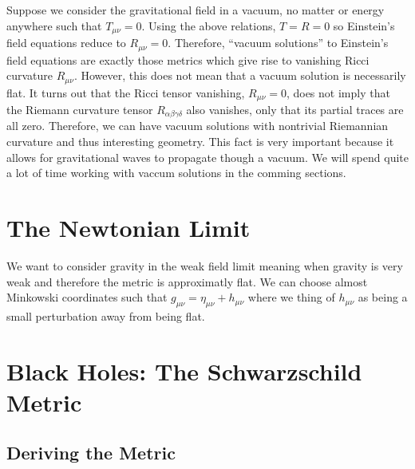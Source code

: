 \documentclass[11pt, a4paper]{article}
\begin{document}
Suppose we consider the gravitational field in a vacuum, no matter or energy anywhere such that $T_{\mu \nu} = 0$. Using the above relations, $T = R = 0$ so Einstein's field equations reduce to $R_{\mu \nu} = 0$. Therefore, ``vacuum solutions'' to Einstein's field equations are exactly those metrics which give rise to vanishing Ricci curvature $R_{\mu \nu}$. However, this does not mean that a vacuum solution is necessarily flat. It turns out that the Ricci tensor vanishing, $R_{\mu \nu} = 0$, does not imply that the Riemann curvature tensor $R_{\alpha \beta \gamma \delta}$ also vanishes, only that its partial traces are all zero. Therefore, we can have vacuum solutions with nontrivial Riemannian curvature and thus interesting geometry. This fact is very important because it allows for gravitational waves to propagate though a vacuum. We will spend quite a lot of time working with vaccum solutions in the comming sections. 

\section{The Newtonian Limit}

We want to consider gravity in the weak field limit meaning when gravity is very weak and therefore the metric is approximatly flat. We can choose almost Minkowski coordinates such that $g_{\mu \nu} = \eta_{\mu \nu} + h_{\mu \nu}$ where we thing of $h_{\mu \nu}$ as being a small perturbation away from being flat.

\section{Black Holes: The Schwarzschild Metric}

\subsection{Deriving the Metric}
\end{document}
